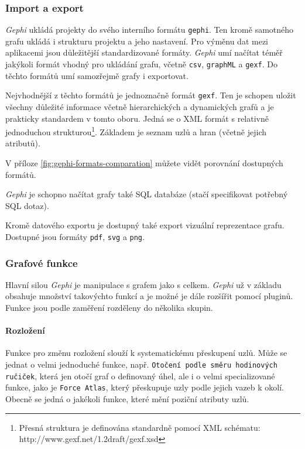 \documentclass[thesis=M,czech]{FITthesis}[2014/05/6]
\begin{document}
\subsubsection{Import a export}
\textit{Gephi} ukládá projekty do svého interního formátu \texttt{gephi}. Ten kromě samotného grafu ukládá i strukturu projektu a jeho nastavení. Pro výměnu dat mezi
aplikacemi jsou důležitější standardizované formáty. \textit{Gephi} umí načítat téměř jakýkoli formát vhodný pro ukládání grafu, včetně \texttt{csv}, \texttt{graphML} a
\texttt{gexf}. Do těchto formátů umí samozřejmě grafy i exportovat.

Nejvhodnější z těchto formátů je jednoznačně formát \texttt{gexf}\cite{gexf}. Ten je schopen uložit všechny důležité informace včetně hierarchických a dynamických grafů a je
prakticky standardem v tomto oboru. Jedná se o XML formát s relativně jednoduchou strukturou\footnote{Přesná struktura je definována standardně pomocí XML schématu: http://www.gexf.net/1.2draft/gexf.xsd}. Základem je seznam uzlů a hran (včetně jejich atributů).

V příloze \ref{fig:gephi-formats-comparation} můžete vidět porovnání dostupných formátů.

\textit{Gephi} je schopno načítat grafy také SQL databáze (stačí specifikovat potřebný SQL dotaz). 

Kromě datového exportu je dostupný také export vizuální reprezentace grafu. Dostupné jsou formáty \texttt{pdf}, \texttt{svg} a \texttt{png}.

\subsubsection{Grafové funkce}
Hlavní silou \textit{Gephi} je manipulace s grafem jako s celkem. \textit{Gephi} už v základu obsahuje množství takovýchto funkcí a je možné je dále rozšířit pomocí pluginů.
Funkce jsou podle zaměření rozděleny do několika skupin.

\paragraph{Rozložení}
Funkce pro změnu rozložení slouží k systematickému přeskupení uzlů. Může se jednat o velmi jednoduché funkce, např. \texttt{Otočení podle směru hodinových ručiček}, která jen otočí graf o
definovaný úhel, ale i o velmi specializované funkce, jako je \texttt{Force Atlas}, který přeskupuje uzly podle jejich vazeb k okolí. Obecně se jedná o jakékoli funkce,
které mění poziční atributy uzlů.
\end{document}
